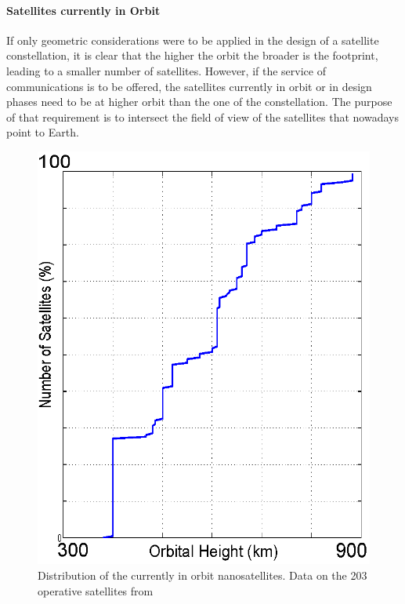 \paragraph{Satellites currently in Orbit\\}
\begin{minipage}{0.45\textwidth}
If only geometric considerations were to be applied in the design of a satellite constellation, it is clear that the higher the orbit the broader is the footprint,  leading to a smaller number of satellites. However, if the service of communications is to be offered, the satellites currently in orbit or in design phases need to be at higher orbit than the one of the constellation. The purpose of that requirement is to intersect the field of view of the satellites that nowadays point to Earth.
\end{minipage}
\begin{minipage}{0.5\textwidth}

\begin{figure}[H]
\centering
	\includegraphics[scale=0.6]{CurrentOrbitDistribution3}
	\caption{Distribution of the currently in orbit nanosatellites. Data on the 203 operative satellites from \cite{nanosats}}	
\end{figure}
\end{minipage}
